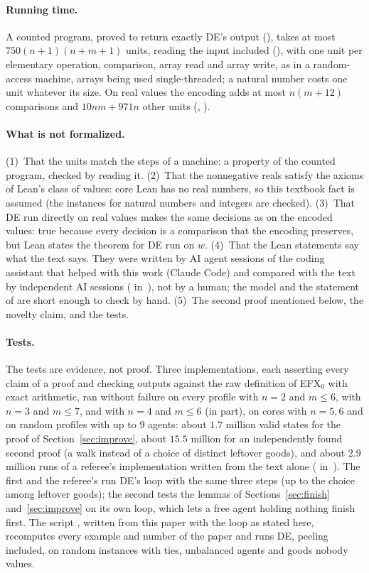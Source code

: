 \documentclass[runningheads,11pt]{llncs}
\newcommand{\efxz}{\texorpdfstring{\mbox{EFX$_0$}}{EFX0}}
\newcommand{\DE}{\textup{DE}}
\begin{document}
\paragraph{Running time.} A counted program, proved to return exactly \DE{}'s output (), takes at most $750(n+1)(n+m+1)$ units, reading the input included (), with one unit per elementary operation, comparison, array read and array write, as in a random-access machine, arrays being used single-threaded; a natural number costs one unit whatever its size. On real values the encoding adds at most $n(m+12)$ comparisons and $10nm+971n$ other units (, ).

\paragraph{What is not formalized.} (1)~That the units match the steps of a machine: a property of the counted program, checked by reading it. (2)~That the nonnegative reals satisfy the axioms of Lean's class of values: core Lean has no real numbers, so this textbook fact is assumed (the instances for natural numbers and integers are checked). (3)~That \DE{} run directly on real values makes the same decisions as on the encoded values: true because every decision is a comparison that the encoding preserves, but Lean states the theorem for \DE{} run on $w$. (4)~That the Lean statements say what the text says. They were written by AI agent sessions of the coding assistant that helped with this work (Claude Code) and compared with the text by independent AI sessions ( in~\cite{Repo}), not by a human; the model and the statement of  are short enough to check by hand. (5)~The second proof mentioned below, the novelty claim, and the tests.

\paragraph{Tests.} The tests are evidence, not proof. Three implementations, each asserting every claim of a proof and checking outputs against the raw definition of \efxz{} with exact arithmetic, ran without failure on every profile with $n=2$ and $m\le6$, with $n=3$ and $m\le7$, and with $n=4$ and $m\le6$ (in part), on cores with $n=5,6$ and on random profiles with up to $9$ agents: about $1.7$ million valid states for the proof of Section~\ref{sec:improve}, about $15.5$ million for an independently found second proof (a walk instead of a choice of distinct leftover goods), and about $2.9$ million runs of a referee's implementation written from the text alone ( in~\cite{Repo}). The first and the referee's run \DE{}'s loop with the same three steps (up to the choice among leftover goods); the second tests the lemmas of Sections~\ref{sec:finish} and~\ref{sec:improve} on its own loop, which lets a free agent holding nothing finish first. The script , written from this paper with the loop as stated here, recomputes every example and number of the paper and runs \DE{}, peeling included, on random instances with ties, unbalanced agents and goods nobody values.
\end{document}
